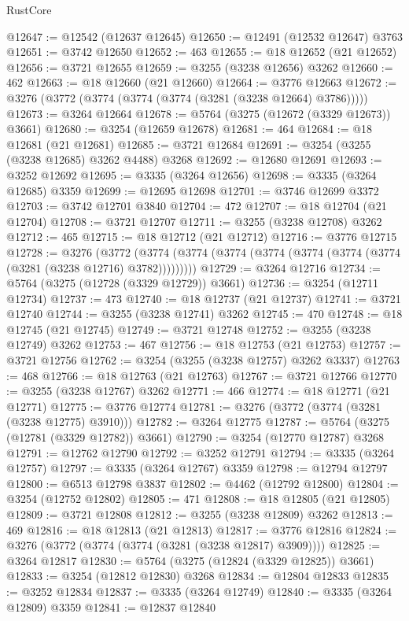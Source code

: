 \begin{lexlean}{RustCore}
\begin{coremodule}
@12647 := @12542 (@12637 @12645)
@12650 := @12491 (@12532 @12647) @3763
@12651 := @3742 @12650
@12652 := 463
@12655 := @18 @12652 (@21 @12652)
@12656 := @3721 @12655
@12659 := @3255 (@3238 @12656) @3262
@12660 := 462
@12663 := @18 @12660 (@21 @12660)
@12664 := @3776 @12663
@12672 := @3276 (@3772 (@3774 (@3774 (@3774 (@3281 (@3238 @12664) @3786)))))
@12673 := @3264 @12664
@12678 := @5764 (@3275 (@12672 (@3329 @12673)) @3661)
@12680 := @3254 (@12659 @12678)
@12681 := 464
@12684 := @18 @12681 (@21 @12681)
@12685 := @3721 @12684
@12691 := @3254 (@3255 (@3238 @12685) @3262 @4488) @3268
@12692 := @12680 @12691
@12693 := @3252 @12692
@12695 := @3335 (@3264 @12656)
@12698 := @3335 (@3264 @12685) @3359
@12699 := @12695 @12698
@12701 := @3746 @12699 @3372
@12703 := @3742 @12701 @3840
@12704 := 472
@12707 := @18 @12704 (@21 @12704)
@12708 := @3721 @12707
@12711 := @3255 (@3238 @12708) @3262
@12712 := 465
@12715 := @18 @12712 (@21 @12712)
@12716 := @3776 @12715
@12728 := @3276
    (@3772 (@3774 (@3774 (@3774 (@3774 (@3774 (@3774 (@3774 (@3281 (@3238 @12716) @3782)))))))))
@12729 := @3264 @12716
@12734 := @5764 (@3275 (@12728 (@3329 @12729)) @3661)
@12736 := @3254 (@12711 @12734)
@12737 := 473
@12740 := @18 @12737 (@21 @12737)
@12741 := @3721 @12740
@12744 := @3255 (@3238 @12741) @3262
@12745 := 470
@12748 := @18 @12745 (@21 @12745)
@12749 := @3721 @12748
@12752 := @3255 (@3238 @12749) @3262
@12753 := 467
@12756 := @18 @12753 (@21 @12753)
@12757 := @3721 @12756
@12762 := @3254 (@3255 (@3238 @12757) @3262 @3337)
@12763 := 468
@12766 := @18 @12763 (@21 @12763)
@12767 := @3721 @12766
@12770 := @3255 (@3238 @12767) @3262
@12771 := 466
@12774 := @18 @12771 (@21 @12771)
@12775 := @3776 @12774
@12781 := @3276 (@3772 (@3774 (@3281 (@3238 @12775) @3910)))
@12782 := @3264 @12775
@12787 := @5764 (@3275 (@12781 (@3329 @12782)) @3661)
@12790 := @3254 (@12770 @12787) @3268
@12791 := @12762 @12790
@12792 := @3252 @12791
@12794 := @3335 (@3264 @12757)
@12797 := @3335 (@3264 @12767) @3359
@12798 := @12794 @12797
@12800 := @6513 @12798 @3837
@12802 := @4462 (@12792 @12800)
@12804 := @3254 (@12752 @12802)
@12805 := 471
@12808 := @18 @12805 (@21 @12805)
@12809 := @3721 @12808
@12812 := @3255 (@3238 @12809) @3262
@12813 := 469
@12816 := @18 @12813 (@21 @12813)
@12817 := @3776 @12816
@12824 := @3276 (@3772 (@3774 (@3774 (@3281 (@3238 @12817) @3909))))
@12825 := @3264 @12817
@12830 := @5764 (@3275 (@12824 (@3329 @12825)) @3661)
@12833 := @3254 (@12812 @12830) @3268
@12834 := @12804 @12833
@12835 := @3252 @12834
@12837 := @3335 (@3264 @12749)
@12840 := @3335 (@3264 @12809) @3359
@12841 := @12837 @12840

\end{coremodule}
\end{lexlean}
